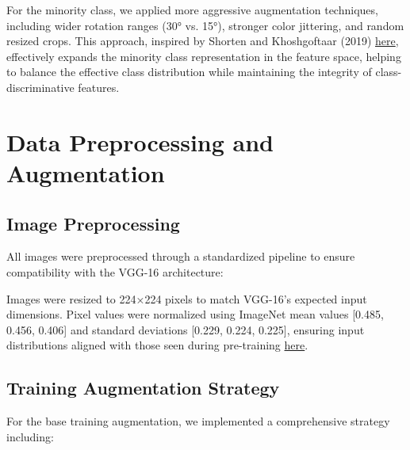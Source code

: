 \documentclass[a4paper,12pt]{article}
\begin{document}
For the minority class, we applied more aggressive augmentation techniques, including wider rotation ranges (30° vs. 15°), stronger color jittering, and random resized crops. This approach, inspired by Shorten and Khoshgoftaar (2019) \href{https://journalofbigdata.springeropen.com/articles/10.1186/s40537-019-0197-0}{here}, effectively expands the minority class representation in the feature space, helping to balance the effective class distribution while maintaining the integrity of class-discriminative features.

\section{Data Preprocessing and Augmentation}

\subsection{Image Preprocessing}
All images were preprocessed through a standardized pipeline to ensure compatibility with the VGG-16 architecture:


Images were resized to 224×224 pixels to match VGG-16's expected input dimensions. Pixel values were normalized using ImageNet mean values [0.485, 0.456, 0.406] and standard deviations [0.229, 0.224, 0.225], ensuring input distributions aligned with those seen during pre-training \href{https://openaccess.thecvf.com/content_cvpr_2016/papers/He_Deep_Residual_Learning_CVPR_2016_paper.pdf}{here}.

\subsection{Training Augmentation Strategy}
For the base training augmentation, we implemented a comprehensive strategy including:

\end{document}
